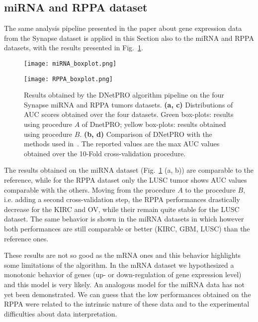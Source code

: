\documentclass{standalone}
\begin{document}
\subsection[miRNA and RPPA data]{miRNA and RPPA dataset}\label{synapse:miRNA}

The same analysis pipeline presented in the paper about gene expression data from the Synapse dataset is applied in this Section also to the miRNA and RPPA datasets, with the results presented in Fig.~\ref{fig:other_results}.

\begin{figure}[htbp]
\centering
\texttt{[image: miRNA\_boxplot.png]}
\qquad
\def\svgwidth{0.45\textwidth}

\newline
\texttt{[image: RPPA\_boxplot.png]}
\qquad
\centering
\def\svgwidth{0.45\textwidth}

\caption{Results obtained by the DNetPRO algorithm pipeline on the four Synapse miRNA and RPPA tumors datasets.
\textbf{(a, c)} Distributions of AUC scores obtained over the four datasets.
Green box-plots: results using procedure $A$ of DnetPRO; yellow box-plots: results obtained using procedure $B$.
\textbf{(b, d)} Comparison of DNetPRO with the methods used in~\cite{Yuan2014}.
The reported values are the max AUC values obtained over the 10-Fold cross-validation procedure.
}
\label{fig:other_results}
\end{figure}

The results obtained on the miRNA dataset (Fig.~\ref{fig:other_results} (a, b)) are comparable to the reference, while for the RPPA dataset only the LUSC tumor shows AUC values comparable with the others.
Moving from the procedure $A$ to the procedure $B$, i.e. adding a second cross-validation step, the RPPA performances drastically decrease for the KIRC and OV, while their remain quite stable for the LUSC dataset.
The same behavior is shown in the miRNA datasets in which however both performances are still comparable or better (KIRC, GBM, LUSC) than the reference ones.

These results are not so good as the mRNA ones and this behavior highlights some limitations of the algorithm.
In the mRNA dataset we hypothesized a monotonic behavior of genes (up- or down-regulation of gene expression level) and this model is very likely.
An analogous model for the miRNA data has not yet been demonstrated.
We can guess that the low performances obtained on the RPPA were related to the intrinsic nature of these data and to the experimental difficulties about data interpretation.
\end{document}
